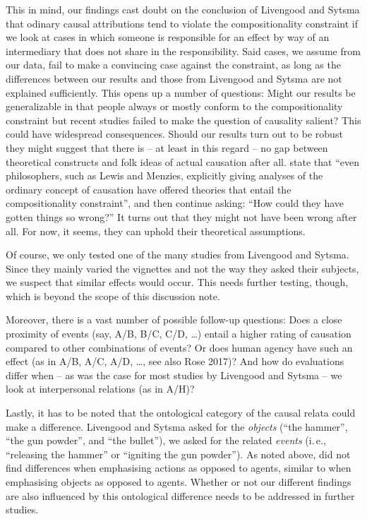 \documentclass[12pt]{scrartcl}
\begin{document}
This in mind, our findings cast doubt on the conclusion of Livengood and Sytsma that odinary causal attributions tend to violate the compositionality constraint if we look at cases in which someone is responsible for an effect by way of an intermediary that does not share in the responsibility. Said cases, we assume from our data, fail to make a convincing case against the constraint, as long as the differences between our results and those from Livengood and Sytsma are not explained sufficiently. This opens up a number of questions: Might our results be generalizable in that people always or mostly conform to the compositionality constraint but recent studies failed to make the question of causality salient? This could have widespread consequences. Should our results turn out to be robust they might suggest that there is -- at least in this regard -- no gap between theoretical constructs and folk ideas of actual causation after all. \citet[64f.]{livengood_actual_2020} state that \enquote{even philosophers, such as Lewis and Menzies, explicitly giving analyses of the ordinary concept of causation have offered theories that entail the compositionality constraint}, and then continue asking: \enquote{How could they have gotten things so wrong?} It turns out that they might not have been wrong after all. For now, it seems, they can uphold their theoretical assumptions.

Of course, we only tested one of the many studies from Livengood and Sytsma. Since they mainly varied the vignettes and not the way they asked their subjects, we suspect that similar effects would occur. This needs further testing, though, which is beyond the scope of this discussion note.

Moreover, there is a vast number of possible follow-up questions: Does a close proximity of events (say, A/B, B/C, C/D, \dots) entail a higher rating of causation compared to other combinations of events? Or does human agency have such an effect (as in A/B, A/C, A/D, \dots, see also Rose 2017)? And how do evaluations differ when -- as was the case for most studies by Livengood and Sytsma -- we look at interpersonal relations (as in A/H)?

Lastly, it has to be noted that the ontological category of the causal relata could make a difference. Livengood and Sytsma asked for the \textit{objects} (\enquote{the hammer}, \enquote{the gun powder}, and \enquote{the bullet}), we asked for the related \textit{events} (i.\,e., \enquote{releasing the hammer} or \enquote{igniting the gun powder}). As noted above, \cite{livengood_following_2017} did not find differences when emphasising actions as opposed to agents, similar to \cite{livengood_actual_2020} when emphasising objects as opposed to agents. Whether or not our different findings are also influenced by this ontological difference needs to be addressed in further studies.
\end{document}

